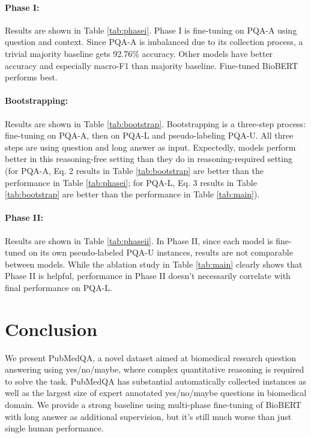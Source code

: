 \documentclass[11pt,a4paper]{article}
\begin{document}
\paragraph{Phase I:} Results are shown in Table \ref{tab:phasei}. Phase I is fine-tuning on PQA-A using question and context. Since PQA-A is imbalanced due to its collection process, a trivial majority baseline gets 92.76\% accuracy. Other models have better accuracy and especially macro-F1 than majority baseline. Fine-tuned BioBERT performs best. 

\paragraph{Bootstrapping:} Results are shown in Table \ref{tab:bootstrap}. Bootstrapping is a three-step process: fine-tuning on PQA-A, then on PQA-L and pseudo-labeling PQA-U. All three steps are using question and long answer as input. Expectedly, models perform better in this reasoning-free setting than they do in reasoning-required setting (for PQA-A, Eq. 2 results in Table \ref{tab:bootstrap} are better than the performance in Table \ref{tab:phasei}; for PQA-L, Eq. 3 results in Table \ref{tab:bootstrap} are better than the performance in Table \ref{tab:main}).

\paragraph{Phase II:} Results are shown in Table \ref{tab:phaseii}. In Phase II, since each model is fine-tuned on its own pseudo-labeled PQA-U instances, results are not comparable between models. While the ablation study in Table \ref{tab:main} clearly shows that Phase II is helpful, performance in Phase II doesn't necessarily correlate with final performance on PQA-L. 

\section{Conclusion}
We present PubMedQA, a novel dataset aimed at biomedical research question answering using yes/no/maybe, where complex quantitative reasoning is required to solve the task. PubMedQA has substantial automatically collected instances as well as the largest size of expert annotated yes/no/maybe questions in biomedical domain. We provide a strong baseline using multi-phase fine-tuning of BioBERT with long answer as additional supervision, but it's still much worse than just single human performance. 
\end{document}
